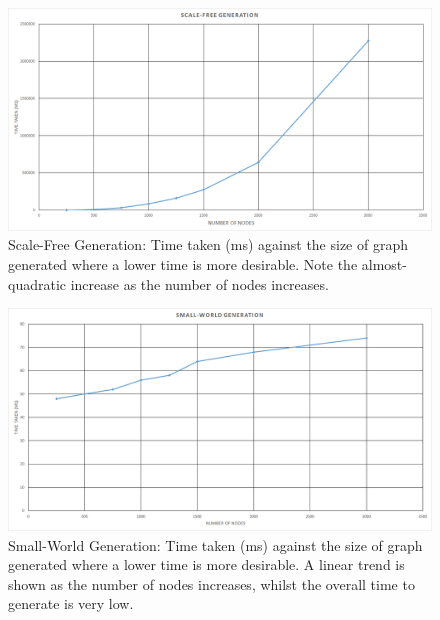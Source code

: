 \documentclass[]{report}
\begin{document}
\begin{figure}
\label{img:SF-gen}
\begin{center}
\includegraphics[width=\textwidth]{scale-free-gen.png}
\end{center}
\caption{Scale-Free Generation: Time taken (ms) against the size of graph generated where a lower time is more desirable. Note the almost-quadratic increase as the number of nodes increases.}
\end{figure}
\begin{figure}
\label{img:SW-gen}
\begin{center}
\includegraphics[width=\textwidth]{small-world-gen.png}
\end{center}
\caption{Small-World Generation: Time taken (ms) against the size of graph generated where a lower time is more desirable. A linear trend is shown as the number of nodes increases, whilst the overall time to generate is very low.}
\end{figure}
\end{document}
